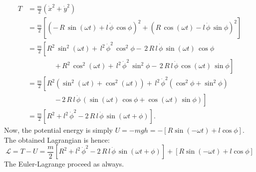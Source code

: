 \begin{equation}
    \begin{split}
        T 
        &= \frac{m}{2}\left(\dot{x}^{2} + \dot{y}^{2}\right) \\[1ex]
        &= \frac{m}{2}\left[\left(-\,R\,\sin(\omega t) + l\,\dot{\phi}\,\cos\phi\right)^{2}
            + \left(R\,\cos(\omega t) - l\,\dot{\phi}\,\sin\phi\right)^{2}\right] \\[1ex]
        &= \frac{m}{2}\left[R^{2}\,\sin^{2}(\omega t)
            +\,l^{2}\,\dot{\phi}^{2}\,\cos^{2}\phi
            -\,2\,R\,l\,\dot{\phi}\,\sin(\omega t)\,\cos\phi \right. \\[-0.2ex]
        &\qquad\qquad\left.
            +\,R^{2}\,\cos^{2}(\omega t)
            +\,l^{2}\,\dot{\phi}^{2}\,\sin^{2}\phi
            -\,2\,R\,l\,\dot{\phi}\,\cos(\omega t)\,\sin\phi
        \right] \\[1ex]
        &= \frac{m}{2}\left[
            R^{2}\left(\sin^{2}(\omega t) + \cos^{2}(\omega t)\right)
            +\,l^{2}\,\dot{\phi}^{2}\left(\cos^{2}\phi + \sin^{2}\phi\right) \right. \\[-0.2ex]
        &\qquad\qquad\left.
            -\,2\,R\,l\,\dot{\phi}\,\left(\sin(\omega t)\,\cos\phi + \cos(\omega t)\,\sin\phi\right)
        \right] \\[1ex]
        &= \frac{m}{2}\left[R^{2} + l^{2}\,\dot{\phi}^{2}
            - 2\,R\,l\,\dot{\phi}\,\sin\left(\omega t + \phi\right)\right].
    \end{split}
\end{equation}
Now, the potential energy is simply $U=-mgh = -[R\sin{(-\omega t)}+l\cos{\phi}]$. The obtained Lagrangian is hence: 
\begin{equation}
    \mathcal{L} = T- U = \frac{m}{2}\left[R^{2} + l^{2}\,\dot{\phi}^{2} - 2\,R\,l\,\dot{\phi}\,\sin\left(\omega t + \phi\right)\right] + [R\sin{(-\omega t)}+l\cos{\phi}]
\end{equation}
The Euler-Lagrange proceed as always. 
